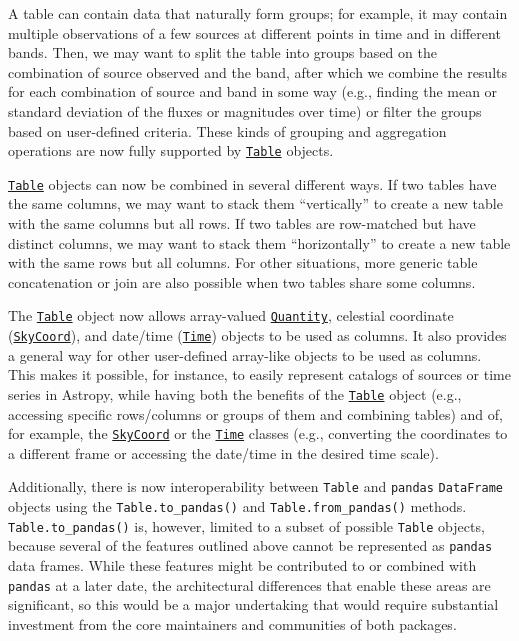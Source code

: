 \documentclass[modern]{aastex62}
\newcommand{\package}[1]{\texttt{#1}\xspace}
\newcommand{\astropy}{Astropy\xspace}
\newcommand{\astropyskycoord}{\href{http://docs.astropy.org/en/stable/api/astropy.coordinates.SkyCoord.html}{\texttt{SkyCoord}}\xspace}
\newcommand{\astropyQuantity}{\href{http://docs.astropy.org/en/stable/api/astropy.units.Quantity.html}{\texttt{Quantity}}\xspace}
\newcommand{\astropyTime}{\href{http://docs.astropy.org/en/stable/api/astropy.time.Time.html}{\texttt{Time}}\xspace}
\newcommand{\astropyTable}{\href{http://docs.astropy.org/en/stable/api/astropy.table.Table.html}{\texttt{Table}}\xspace}
\begin{document}
A table can contain data that naturally form groups; for example, it may
contain multiple observations of a few sources at different points in time
and in different bands. Then, we may want to split the table into groups based
on the combination of source observed and the band, after which we combine the
results for each combination of source and band in some way (e.g., finding
the mean or standard deviation of the fluxes or magnitudes over time) or filter
the groups based on user-defined criteria. These kinds of grouping and
aggregation operations are now fully supported by \astropyTable objects.


\astropyTable objects can now be combined in several different ways. If two
tables have the same columns, we may want to stack them ``vertically'' to create a
new table with the same columns but all rows. If two tables are row-matched but
have distinct columns, we may want to stack them ``horizontally'' to create a
new table with the same rows but all columns. For other situations, more generic
table concatenation or join are also possible when two tables share some
columns.


The \astropyTable object now allows array-valued \astropyQuantity, celestial
coordinate (\astropyskycoord), and date/time (\astropyTime) objects to
be used as columns. It also provides a general way for other user-defined
array-like objects to be used as columns.
This makes it possible, for instance, to easily
represent catalogs of sources or time series in \astropy, while having both the
benefits of the \astropyTable object (e.g., accessing specific rows/columns
or groups of them and combining tables) and of, for example,
the \astropyskycoord or the \astropyTime classes (e.g., converting the
coordinates to a different frame or accessing the date/time in the desired time scale).

Additionally, there is now interoperability between \texttt{Table}
and \package{pandas} \texttt{DataFrame} objects using the \texttt{Table.to\_pandas()}
and \texttt{Table.from\_pandas()} methods. \texttt{Table.to\_pandas()} is,
however, limited to a subset of possible \texttt{Table} objects, because several
of the features outlined above cannot be represented as \package{pandas} data
frames. While these features might be contributed to or combined with
\package{pandas} at a later date, the architectural differences that
enable these areas are significant, so this would be a major undertaking that would 
require substantial investment from the core maintainers and communities of both 
packages.
\end{document}
